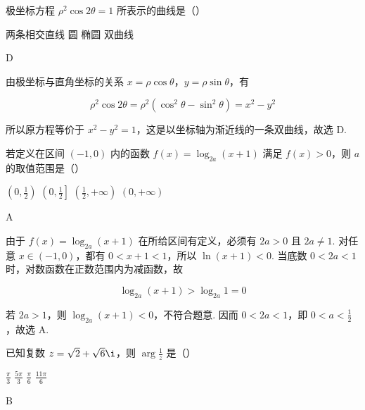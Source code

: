 \begin{problem}
极坐标方程 \(\rho^2\cos 2\theta = 1\) 所表示的曲线是（\quad）

\choices
    {两条相交直线}
    {圆}
    {椭圆}
    {双曲线}
\end{problem}

\begin{answer}
D
\end{answer}

\begin{solution}
由极坐标与直角坐标的关系 \(x=\rho\cos\theta\)，\(y=\rho\sin\theta\)，有

\[
\rho^2\cos2\theta=\rho^2\left(\cos^2\theta-\sin^2\theta\right)=x^2-y^2
\]

所以原方程等价于 \(x^2-y^2=1\)，这是以坐标轴为渐近线的一条双曲线，故选 D.
\end{solution}

\begin{problem}
若定义在区间 \((-1,0)\) 内的函数 \(f(x) = \log_{2a}(x + 1)\) 满足 \(f(x) > 0\)，则 \(a\) 的取值范围是（\quad）

\choices
    {\(\left(0, \frac{1}{2}\right)\)}
    {\(\left(0, \frac{1}{2}\right]\)}
    {\(\left(\frac{1}{2}, +\infty\right)\)}
    {\((0, +\infty)\)}
\end{problem}

\begin{answer}
A
\end{answer}

\begin{solution}
由于 \(f(x)=\log_{2a}(x+1)\) 在所给区间有定义，必须有 \(2a>0\) 且 \(2a\ne1\). 对任意 \(x\in(-1,0)\)，都有 \(0<x+1<1\)，所以 \(\ln(x+1)<0\). 当底数 \(0<2a<1\) 时，对数函数在正数范围内为减函数，故

\[
\log_{2a}(x+1)>\log_{2a}1=0
\]

若 \(2a>1\)，则 \(\log_{2a}(x+1)<0\)，不符合题意. 因而 \(0<2a<1\)，即 \(0<a<\frac12\)，故选 A.
\end{solution}

\begin{problem}
已知复数 \(z = \sqrt{2} + \sqrt{6}\i\)，则 \(\arg \frac{1}{z}\) 是（\quad）

\choices
    {\(\frac{\pi}{3}\)}
    {\(\frac{5\pi}{3}\)}
    {\(\frac{\pi}{6}\)}
    {\(\frac{11\pi}{6}\)}
\end{problem}

\begin{answer}
B
\end{answer}

